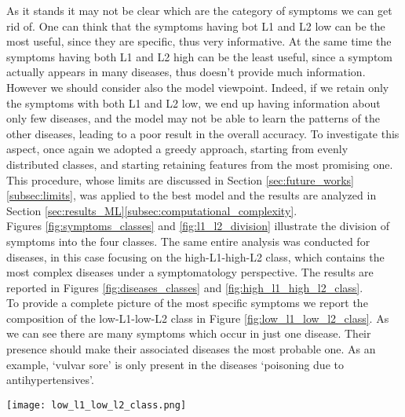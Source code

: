 \noindent
As it stands it may not be clear which are the category of symptoms we can get rid of. One can think that the symptoms having bot L1
and L2 low can be the most useful, since they are specific, thus very informative. At the same time the symptoms having both L1 and L2 high
can be the least useful, since a symptom actually appears in many diseases, thus doesn't provide much information.
However we should consider also the model viewpoint. Indeed, if we retain only the symptoms with both L1 and L2 low, we end up
having information about only few diseases, and the model may not be able to learn the patterns of the other diseases, leading
to a poor result in the overall accuracy. To investigate this aspect, once again we adopted a greedy approach, starting from evenly distributed
classes, and starting retaining features from the most promising one. This procedure, whose limits are discussed in
Section \ref{sec:future_works}\ref{subsec:limits}, was applied to the best model and the results are analyzed in
Section \ref{sec:results_ML}\ref{subsec:computational_complexity}.\\
Figures \ref{fig:symptoms_classes} and \ref{fig:l1_l2_division} illustrate the division of symptoms into the four classes.
The same entire analysis was conducted for diseases, in this case focusing on the high-L1-high-L2 class, which contains
the most complex diseases under a symptomatology perspective. The results are reported in Figures \ref{fig:diseases_classes}
and \ref{fig:high_l1_high_l2_class}.\\
To provide a complete picture of the most specific symptoms we report the composition of the low-L1-low-L2 class
in Figure \ref{fig:low_l1_low_l2_class}. As we can see there are many symptoms which occur in just one disease.
Their presence should make their associated diseases the most probable one. As an example, `vulvar sore'
is only present in the diseases `poisoning due to antihypertensives'.\\

\begin{figure*}[!t]
    \centering
    \texttt{[image: low\_l1\_low\_l2\_class.png]}
    \caption{Composition of the low-L1-low-L2 class for symptoms}\label{fig:low_l1_low_l2_class}
\end{figure*}






